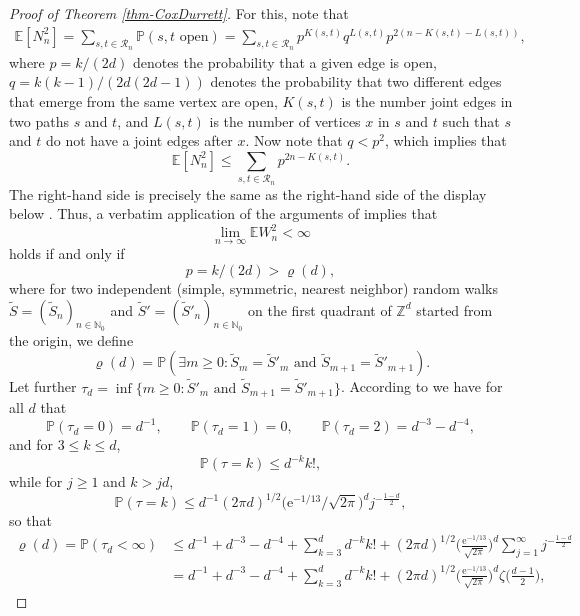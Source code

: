 \documentclass[a4paper, oneside, 11pt]{amsart}
\newcommand{\e}{\mathrm e}
\newcommand{\N}{\mathbb{N}}
\theoremstyle{definition}
\renewcommand{\P}{\mathbb{P}}
\newcommand{\1}{\mathbbm{1}}
\newcommand{\E}{\mathbb{E}}
\newcommand{\0}{\mathbf{o}}
\newcommand{\Z}{\mathbb{Z}}
\numberwithin{equation}{section}
\begin{document}
\begin{proof}[Proof of Theorem \ref{thm-CoxDurrett}]
For this, note that 
\begin{align*}
\E[N_n^2]=\sum_{s,t\in \mathcal R_n}\P(s,t\text{ open})=\sum_{s,t\in \mathcal R_n}p^{K(s,t)}q^{L(s,t)}p^{2(n-K(s,t)-L(s,t))},
\end{align*}
where $p=k/(2d)$ denotes the probability that a given edge is open, $q=k(k-1)/(2d(2d-1))$ denotes the probability that two different edges that emerge from the same vertex are open, $K(s,t)$ is the number joint edges in two paths $s$ and $t$, and $L(s,t)$ is the number of vertices $x$ in $s$ and $t$ such that $s$ and $t$ do not have a joint edges after $x$.  Now note that $q<p^2$, which implies that
\[ \E[N_n^2] \leq \sum_{s,t\in \mathcal R_n} p^{2n-K(s,t)}. \]
The right-hand side is precisely the same as the right-hand side of the display below \cite[Equation~(2$\cdot$7)]{CoxDurrett}. Thus, a verbatim application of the arguments of \cite[Section 2]{CoxDurrett} implies that 
\[ \lim_{n\to\infty} \E W_n^2 <\infty \]
holds if and only if 
\[ p =k/(2d)> \varrho(d), \]
where for two independent (simple, symmetric, nearest neighbor) random walks $\widetilde S=(\widetilde S_n)_{n\in\N_0}$ and $\widetilde S'=(\widetilde S'_n)_{n\in\N_0}$ on the first quadrant of $\Z^d$ started from the origin, we define
\[ \varrho(d) = \P(\exists m\geq 0 \colon \widetilde S_m = \widetilde S'_m \text{ and } \widetilde S_{m+1} = \widetilde S'_{m+1}). \]
Let further $\tau_d=\inf \{ m \geq 0 \colon \widetilde S'_m \text{ and } \widetilde S_{m+1} = \widetilde S'_{m+1} \}$.
According to \cite[p.~155]{CoxDurrett} we have for all $d$ that
\begin{equation}\label{firstfew} 
    \P(\tau_d=0)=d^{-1}, \qquad \P(\tau_d=1)=0, \qquad \P(\tau_d=2)=d^{-3}-d^{-4}, 
\end{equation}
and for $3 \leq k \leq d$,
\[ \P(\tau=k) \leq d^{-k} k!, \]
while for $j\geq 1$ and $k >jd$,
\begin{equation}\label{bigk} 
    \P(\tau=k) \leq d^{-1} (2\pi d)^{1/2} \Big( \e^{-1/13}/\sqrt{2\pi} \Big)^d j^{-\frac{1-d}{2}},
\end{equation}
so that
\begin{equation}\label{CDUB} 
    \begin{aligned} 
        \varrho(d)=\P(\tau_d<\infty) 
        &\leq 
        d^{-1} + d^{-3} -d^{-4} + \sum_{k=3}^d d^{-k} k! +  (2\pi d)^{1/2} \Big( \frac{\e^{-1/13}}{\sqrt{2\pi}} \Big)^d \sum_{j=1}^{\infty} j^{-\frac{1-d}{2}} 
        \\ 
        & =
        d^{-1} + d^{-3} -d^{-4} + \sum_{k=3}^d d^{-k} k! +  (2\pi d)^{1/2} \Big( \frac{\e^{-1/13}}{\sqrt{2\pi}} \Big)^d \zeta\Big( \frac{d-1}{2} \Big), 

\end{aligned}
\end{equation}
\end{proof}
\end{document}
